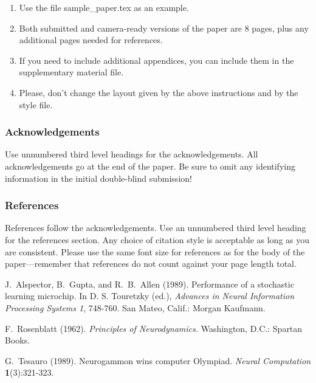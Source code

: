 \documentclass[twoside]{article} \usepackage{aistats2017}
\begin{document}
\begin{enumerate}
    \item Use the file sample\_paper.tex as an example.

    \item Both submitted and camera-ready versions of the paper are 8
      pages, plus any additional pages needed for references.

    \item If you need to include additional appendices,
      you can include them in the supplementary
      material file.

    \item Please, don't change the layout given by the above
      instructions and by the style file.

\end{enumerate}

\subsubsection*{Acknowledgements}

Use unnumbered third level headings for the acknowledgements.  All
acknowledgements go at the end of the paper.  Be sure to omit any
identifying information in the initial double-blind submission!


\subsubsection*{References}

References follow the acknowledgements.  Use an unnumbered third level
heading for the references section.  Any choice of citation style is
acceptable as long as you are consistent.  Please use the same font
size for references as for the body of the paper---remember that
references do not count against your page length total.

J.~Alspector, B.~Gupta, and R.~B.~Allen (1989). Performance of a
stochastic learning microchip.  In D. S. Touretzky (ed.), {\it
  Advances in Neural Information Processing Systems 1}, 748-760.  San
Mateo, Calif.: Morgan Kaufmann.

F.~Rosenblatt (1962). {\it Principles of Neurodynamics.} Washington,
D.C.: Spartan Books.

G.~Tesauro (1989). Neurogammon wins computer Olympiad.  {\it Neural
  Computation} {\bf 1}(3):321-323.
\end{document}

